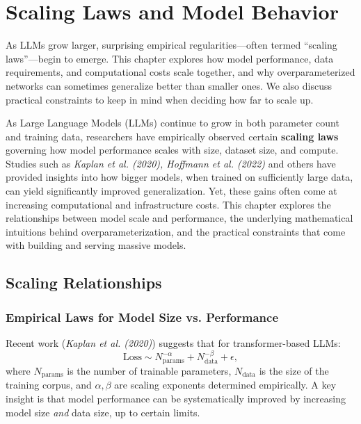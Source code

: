 \chapter{Scaling Laws and Model Behavior}
\label{chap:scaling_laws}

\noindent
As LLMs grow larger, surprising empirical regularities—often termed “scaling laws”—begin to emerge. This chapter explores how model performance, data requirements, and computational costs scale together, and why overparameterized networks can sometimes generalize better than smaller ones. We also discuss practical constraints to keep in mind when deciding how far to scale up.


\noindent
As Large Language Models (LLMs) continue to grow in both parameter count and training data, researchers have empirically observed certain \textbf{scaling laws} governing how model performance scales with size, dataset size, and compute. Studies such as \emph{Kaplan et al. (2020), Hoffmann et al. (2022)} and others have provided insights into how bigger models, when trained on sufficiently large data, can yield significantly improved generalization. Yet, these gains often come at increasing computational and infrastructure costs. This chapter explores the relationships between model scale and performance, the underlying mathematical intuitions behind overparameterization, and the practical constraints that come with building and serving massive models.

\section{Scaling Relationships}
\label{sec:scaling_relationships}

\subsection{Empirical Laws for Model Size vs. Performance}
\noindent
Recent work (\emph{Kaplan et al. (2020)}) suggests that for transformer-based LLMs:
\[
\text{Loss} \sim N_\text{params}^{-\alpha} + N_\text{data}^{-\beta} + \epsilon,
\]
where \(N_\text{params}\) is the number of trainable parameters, \(N_\text{data}\) is the size of the training corpus, and \(\alpha, \beta\) are scaling exponents determined empirically. A key insight is that model performance can be systematically improved by increasing model size \emph{and} data size, up to certain limits.

